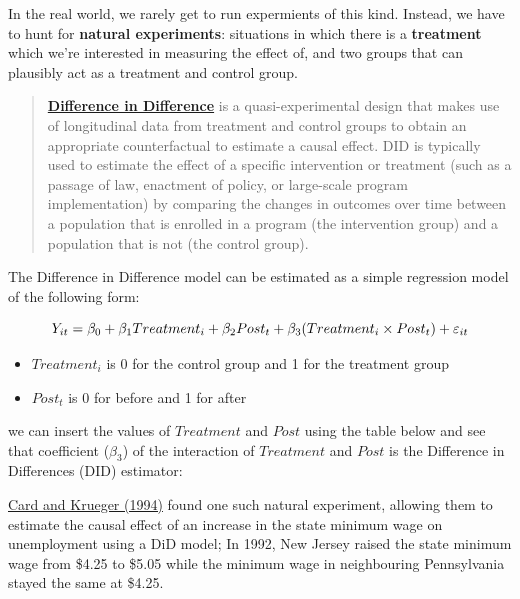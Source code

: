 \documentclass[
  letterpaper,
  DIV=11,
  numbers=noendperiod]{scrreprt}
\providecommand{\tightlist}{%
  \setlength{\itemsep}{0pt}\setlength{\parskip}{0pt}}\usepackage{longtable,booktabs,array}
\begin{document}
In the real world, we rarely get to run expermients of this kind.
Instead, we have to hunt for \textbf{natural experiments}: situations in
which there is a \textbf{treatment} which we're interested in measuring
the effect of, and two groups that can plausibly act as a treatment and
control group.

\begin{quote}
\textbf{\href{https://www.publichealth.columbia.edu/research/population-health-methods/difference-difference-estimation\#:~:text=DID\%20relies\%20on\%20a\%20less,individual\%20level\%20is\%20not\%20possible.}{Difference
in Difference}} is a quasi-experimental design that makes use of
longitudinal data from treatment and control groups to obtain an
appropriate counterfactual to estimate a causal effect. DID is typically
used to estimate the effect of a specific intervention or treatment
(such as a passage of law, enactment of policy, or large-scale program
implementation) by comparing the changes in outcomes over time between a
population that is enrolled in a program (the intervention group) and a
population that is not (the control group).
\end{quote}

The Difference in Difference model can be estimated as a simple
regression model of the following form:

\[\huge Y_{it} = \beta_0 + \beta_1 Treatment_i + \beta_2 Post_t + \beta_3 (Treatment_i \times Post_t) + \varepsilon_{it}\]

\begin{itemize}
\tightlist
\item
  \(Treatment_i\) is 0 for the control group and 1 for the treatment
  group
\item
  \(Post_t\) is 0 for before and 1 for after
\end{itemize}

we can insert the values of \(Treatment\) and \(Post\) using the table
below and see that coefficient (\(\beta_3\)) of the interaction of
\(Treatment\) and \(Post\) is the Difference in Differences (DID)
estimator:

\href{https://davidcard.berkeley.edu/papers/njmin-aer.pdf}{Card and
Krueger (1994)} found one such natural experiment, allowing them to
estimate the causal effect of an increase in the state minimum wage on
unemployment using a DiD model; In 1992, New Jersey raised the state
minimum wage from \$4.25 to \$5.05 while the minimum wage in
neighbouring Pennsylvania stayed the same at \$4.25.
\end{document}
